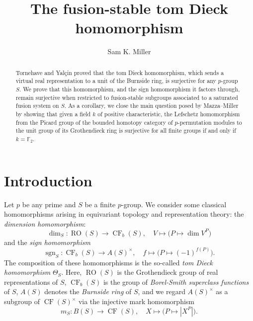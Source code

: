 \documentclass[]{amsart}
\newcommand{\on}[1]{\operatorname{#1}}
\newcommand{\bbF}{\mathbb{F}}
\theoremstyle{remark}
\theoremstyle{definition}
\begin{document}
	\title{The fusion-stable tom Dieck homomorphism}
	\author{Sam K. Miller}
	\address{Department of Mathematics, University of Georgia, Athens GA 30602, United States of America} %
	\begin{abstract}
		Tornehave and Yal\c{c}in proved that the tom Dieck homomorphism, which sends a virtual real representation to a unit of the Burnside ring, is surjective for any $p$-group $S$. We prove that this homomorphism, and the sign homomorphism it factors through, remain surjective when restricted to fusion-stable subgroups associated to a saturated fusion system on $S$. As a corollary, we close the main question posed by Mazza--Miller by showing that given a field $k$ of positive characteristic, the Lefschetz homomorphism from the Picard group of the bounded homotopy category of $p$-permutation modules to the unit group of its Grothendieck ring is surjective for all finite groups if and only if $k = \bbF_2$. 
	\end{abstract}
	
	\maketitle
	
	
	\section*{Introduction}
	
	Let $p$ be any prime and $S$ be a finite $p$-group. We consider some classical homomorphisms arising in equivariant topology and representation theory: the \emph{dimension homomorphism}: 
	\[\dim_S\colon \on{RO}(S) \to \on{CF}_b(S),\quad V \mapsto \big(P \mapsto \dim V^P\big)\] and the \emph{sign homomorphism} 
	\[\on{sgn}_S\colon \on{CF}_b(S)\to A(S)^\times,\quad f \mapsto \big(P \mapsto (-1)^{f(P)}\big).\] The composition of these homomorphisms is the so-called \emph{tom Dieck homomorphism} $\Theta_S$. Here, $\on{RO}(S)$ is the Grothendieck group of real representations of $S$, $\on{CF}_b(S)$ is the group of \emph{Borel-Smith superclass functions} of $S$, $A(S)$ denotes the \emph{Burnside ring} of $S$, and we regard $A(S)^\times$ as a subgroup of $\on{CF}(S)^\times$ via the injective mark homomorphism 
	\[m_S\colon B(S) \to \on{CF}(S), \quad X \mapsto \big(P \mapsto |X^P|\big).\] 
	
\end{document}
